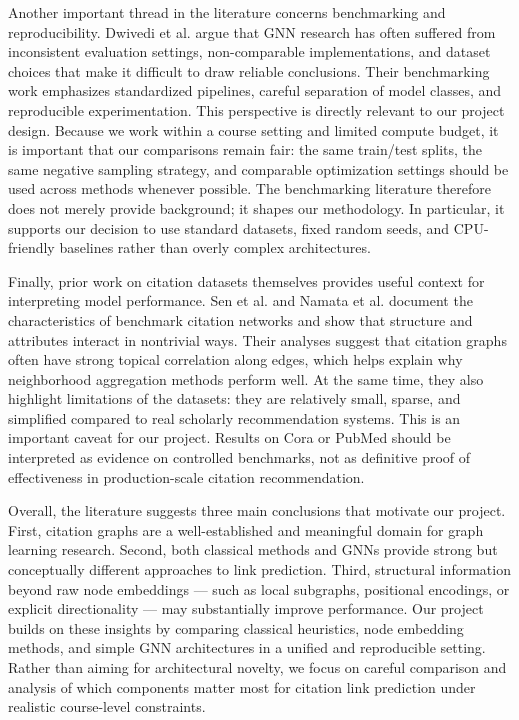 \documentclass[11pt,a4paper]{article}
\begin{document}
Another important thread in the literature concerns benchmarking and reproducibility.
Dwivedi et al. \cite{dwivedi2023benchmarking} argue that GNN research has often suffered
from inconsistent evaluation settings, non-comparable implementations,
and dataset choices that make it difficult to draw reliable conclusions.
Their benchmarking work emphasizes standardized pipelines,
careful separation of model classes, and reproducible experimentation.
This perspective is directly relevant to our project design.
Because we work within a course setting and limited compute budget,
it is important that our comparisons remain fair:
the same train/test splits, the same negative sampling strategy,
and comparable optimization settings should be used across methods whenever possible.
The benchmarking literature therefore does not merely provide background;
it shapes our methodology.
In particular, it supports our decision to use standard datasets,
fixed random seeds, and CPU-friendly baselines rather than overly complex architectures.

Finally, prior work on citation datasets themselves provides useful context
for interpreting model performance.
Sen et al. \cite{sen2008collective} and Namata et al. \cite{namata2012query}
document the characteristics of benchmark citation networks
and show that structure and attributes interact in nontrivial ways.
Their analyses suggest that citation graphs often have strong topical correlation along edges,
which helps explain why neighborhood aggregation methods perform well.
At the same time, they also highlight limitations of the datasets:
they are relatively small, sparse, and simplified compared to real scholarly recommendation systems.
This is an important caveat for our project.
Results on Cora or PubMed should be interpreted as evidence on controlled benchmarks,
not as definitive proof of effectiveness in production-scale citation recommendation.

Overall, the literature suggests three main conclusions that motivate our project.
First, citation graphs are a well-established and meaningful domain for graph learning research.
Second, both classical methods and GNNs provide strong but conceptually different approaches
to link prediction.
Third, structural information beyond raw node embeddings --- such as local subgraphs,
positional encodings, or explicit directionality --- may substantially improve performance.
Our project builds on these insights by comparing classical heuristics,
node embedding methods, and simple GNN architectures in a unified and reproducible setting.
Rather than aiming for architectural novelty,
we focus on careful comparison and analysis of which components matter most
for citation link prediction under realistic course-level constraints.
\end{document}
